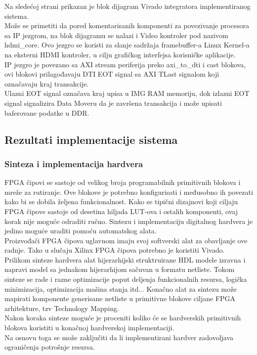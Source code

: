 Na sledećoj strani prikazan je blok dijagram Vivado integratora implementiranog
sistema. \\
Može se primetiti da pored komentarisanih komponenti za povezivanje procesora sa
IP jezgrom, na blok dijagramu se nalazi i Video kontroler pod nazivom
hdmi\_core.
Ovo jezgro se koristi za slanje sadržaja framebuffer-a Linux Kernel-a na
eksterni HDMI kontroler, u cilju grafičkog interfejsa korisničke aplikacije. \\
IP jezgro je povezano sa AXI stream periferija preko axi\_to\_dti i cast blokova,
ovi blokovi prilagođavaju DTI EOT signal sa AXI TLast signalom koji označavaju
kraj transakcije. \\
Ulazni EOT signal označava kraj upisa u IMG RAM memoriju, dok izlazni EOT signal
signalizira Data Moveru da je završena transakcija i može upisati baferovane
podatke u DDR. \\




\subsection{Rezultati implementacije sistema}

\subsubsection{Sinteza i implementacija hardvera}
FPGA čipovi se sastoje od velikog broja programabilnih primitivnih blokova i
mreže za rutiranje.
Ove blokove je potrebno konfigurisati i međusobno ih povezati kako bi se dobila
željena funkcionalnost.
Kako se tipični dizajnovi koji ciljaju FPGA čipove sastoje od desetina hiljada
LUT-ova i ostalih komponenti, ovaj korak nije moguće odraditi ručno.
Sintezu i implementaciju digitalnog hardvera je jedino moguće uraditi pomoću
automatskog alata. \\

Proizvođači FPGA čipova uglavnom imaju svoj softverski alat za obavljanje ove
radnje.
Tako u slučaju Xilinx FPGA čipova potrebno je koristiti Vivado.\\

Prilikom sinteze hardvera alat hijerarhijski struktruirane HDL modele izravna i
napravi model sa jednakom hijerarhijom sačuvan u formatu netliste.
Tokom sinteze se rade i razne optimizacije poput deljenja funkcionalnih resursa,
logička minimizacija, optimizacija mašina stanja itd...
Konačno alat za sintezu može mapirati komponente generisane netliste u
primitivne blokove ciljane FPGA arhitekture, tzv Technology Mapping. \\
Nakon koraka sinteze moguće je proceniti koliko će se hardverskih primitivnih
blokova koristiti u konačnoj hardverskoj implementaciji. \\
Na osnovu toga se može zaključiti da li implementirani hardver zadovoljava
ograničenja potrošnje resursa. \\

